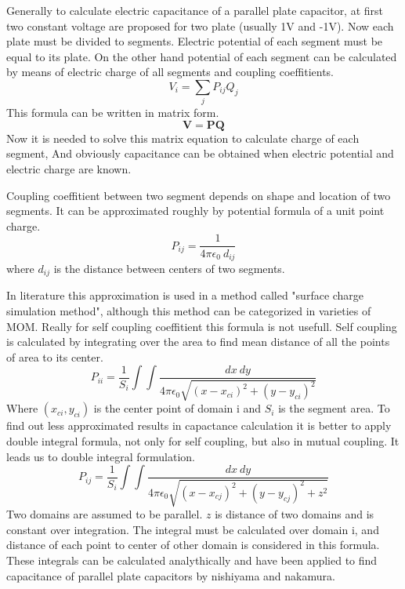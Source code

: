 \documentclass[twoside,twocolumn]{article}
\begin{document}
Generally to calculate electric capacitance of a parallel plate capacitor, at first two constant voltage are proposed for two plate (usually 1V and -1V). Now each plate must be divided to segments. Electric potential of each segment must be equal to its plate. On the other hand potential of each segment can be calculated by means of electric charge of all segments and coupling coeffitients.
\begin{equation}
\label{eq1}
V_i = \sum_j P_{ij} Q_j
\end{equation}
This formula can be written in matrix form.
\begin{equation}
\label{eq2}
\mathbf V = \mathbf P \mathbf Q
\end{equation}
 Now it is needed to solve this matrix equation to calculate charge of each segment, And obviously capacitance can be obtained when electric potential and electric charge are known.
 
Coupling coeffitient between two segment depends on shape and location of two segments. It can be approximated roughly by potential formula of a unit point charge. 
\begin{equation}
\label{eq3}
P_{ij} = \frac{1}{4 \pi \epsilon_0\  d_{ij}}
\end{equation}
where $d_{ij}$ is the distance between centers of two segments.


In literature this approximation is used in a method called "surface charge simulation method", although this method can be categorized in varieties of MOM. Really for self coupling coeffitient this formula is not usefull. Self coupling is calculated by integrating over the area to find mean distance of all the points of area to its center.
\begin{equation}
\label{eq4}
P_{ii} = \frac 1 {S_i} \int \int \frac {dx\  dy}{4 \pi \epsilon_0 \sqrt{(x-x_{ci})^2 + (y-y_{ci})^2}}
\end{equation}
Where $(x_{ci}, y_{ci})$ is the center point of domain i and $S_i $ is the segment area.
To find out less approximated results in capactance calculation it is better to apply double integral formula, not only for self coupling, but also in mutual coupling. It leads us to double integral formulation.
\begin{equation}
\label{eq5}
P_{ij} = \frac 1 {S_i}\int \int \frac {dx\  dy}{4 \pi \epsilon_0 \sqrt{(x-x_{cj})^2 + (y-y_{cj})^2+ z^2}}
\end{equation}
Two domains are assumed to be parallel. $z$ is  distance of two domains and is constant over integration. The integral must be calculated over domain i, and distance of each point to center of other domain is considered in this formula. These integrals can be calculated analythically and have been applied to find capacitance of parallel plate capacitors by nishiyama and nakamura.
\end{document}
